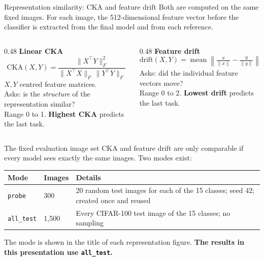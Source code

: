 \documentclass[aspectratio=169,11pt]{beamer}
\newcommand{\hl}[1]{{\color{accent}\bfseries #1}}
\begin{document}
\begin{frame}{Representation similarity: CKA and feature drift}
  Both are computed on the same fixed images. For each image, the 512-dimensional feature vector before the classifier is extracted from the final model and from each reference.

  \medskip
  \begin{columns}[T]
    \begin{column}{0.48\textwidth}
      \textbf{Linear CKA}
      \[
        \mathrm{CKA}(X,Y)=\frac{\lVert X^\top Y\rVert_F^2}{\lVert X^\top X\rVert_F\,\lVert Y^\top Y\rVert_F}
      \]
      $X,Y$ centred feature matrices.\\
      Asks: is the \emph{structure} of the representation similar?\\
      Range 0 to 1. \hl{Highest CKA} predicts the last task.
    \end{column}
    \begin{column}{0.48\textwidth}
      \textbf{Feature drift}
      \[
        \mathrm{drift}(X,Y)=\operatorname{mean}\left\lVert \tfrac{x}{\lVert x\rVert}-\tfrac{y}{\lVert y\rVert}\right\rVert_2
      \]
      Asks: did the individual feature vectors move?\\
      Range 0 to 2. \hl{Lowest drift} predicts the last task.
    \end{column}
  \end{columns}
\end{frame}

\begin{frame}{The fixed evaluation image set}
  CKA and feature drift are only comparable if every model sees exactly the same images. Two modes exist:

  \bigskip
  \centering
  \begin{tabular}{@{}lp{3.2cm}p{5.6cm}@{}}
    \toprule
    \textbf{Mode} & \textbf{Images} & \textbf{Details}\\
    \midrule
    \texttt{probe} & 300 & 20 random test images for each of the 15 classes; seed 42; created once and reused\\[3pt]
    \texttt{all\_test} & 1{,}500 & Every CIFAR-100 test image of the 15 classes; no sampling\\
    \bottomrule
  \end{tabular}

  \bigskip
  \raggedright
  The mode is shown in the title of each representation figure. \textbf{The results in this presentation use \texttt{all\_test}.}
\end{frame}
\end{document}
